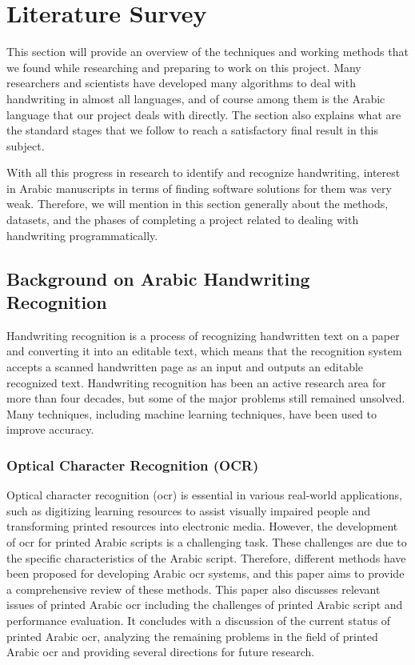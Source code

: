 \chapter{Literature Survey}
\label{ch:literature-survey}

\quad This section will provide an overview of the techniques and working methods that we found while researching and preparing to work on this project. Many researchers and scientists have developed many algorithms to deal with handwriting in almost all languages, and of course among them is the Arabic language that our project deals with directly. The section also explains what are the standard stages that we follow to reach a satisfactory final result in this subject.

With all this progress in research to identify and recognize handwriting, interest in Arabic manuscripts in terms of finding software solutions for them was very weak. Therefore, we will mention in this section generally about the methods, datasets, and the phases of completing a project related to dealing with handwriting programmatically.


\section{Background on Arabic Handwriting Recognition}
Handwriting recognition is a process of recognizing handwritten text on a paper and converting it into an editable text, which means that the recognition system accepts a scanned handwritten page as an input and outputs an editable recognized text. Handwriting recognition has been an active research area for more than four decades, but some of the major problems still remained unsolved. Many techniques, including machine learning techniques, have been used to improve accuracy.

\subsection{Optical Character Recognition (OCR)}
Optical character recognition (\acrshort{ocr}) is essential in various real-world applications, such as digitizing learning resources to assist visually impaired people and transforming printed resources into electronic media. However, the development of \acrshort{ocr} for printed Arabic scripts is a challenging task. These challenges are due to the specific characteristics of the Arabic script. Therefore, different methods have been proposed for developing Arabic \acrshort{ocr} systems, and this paper \cite{Alghamdi2018} aims to provide a comprehensive review of these methods. This paper also discusses relevant issues of printed Arabic \acrshort{ocr} including the challenges of printed Arabic script and performance evaluation. It concludes with a discussion of the current status of printed Arabic \acrshort{ocr}, analyzing the remaining problems in the field of printed Arabic \acrshort{ocr} and providing several directions for future research. \\

